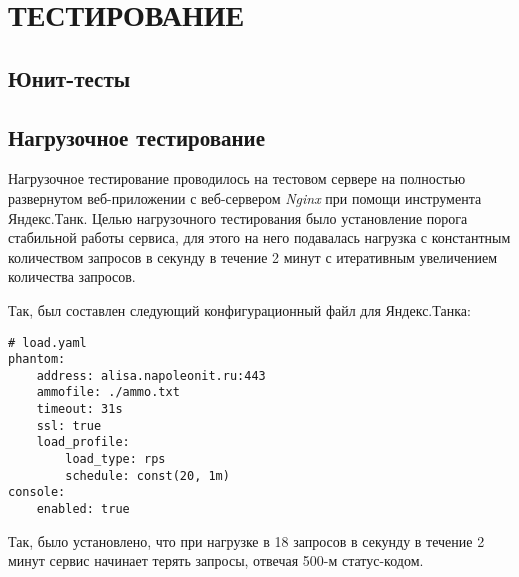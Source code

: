 \section{ТЕСТИРОВАНИЕ}
    \subsection{Юнит-тесты}


    \subsection{Нагрузочное тестирование}
    Нагрузочное тестирование проводилось на тестовом сервере на полностью
    развернутом веб-приложении с веб-сервером \textit{Nginx} при помощи
    инструмента Яндекс.Танк. Целью нагрузочного тестирования было установление
    порога стабильной работы сервиса, для этого на него подавалась нагрузка
    с константным количеством запросов в секунду в течение 2 минут с итеративным
    увеличением количества запросов.

    Так, был составлен следующий конфигурационный файл для Яндекс.Танка:
    \begin{lstlisting}
# load.yaml
phantom:
    address: alisa.napoleonit.ru:443
    ammofile: ./ammo.txt
    timeout: 31s
    ssl: true
    load_profile:
        load_type: rps 
        schedule: const(20, 1m)
console:
    enabled: true 
    \end{lstlisting}

    Так, было установлено, что при нагрузке в 18 запросов в секунду в течение 2 минут
    сервис начинает терять запросы, отвечая 500-м статус-кодом.
